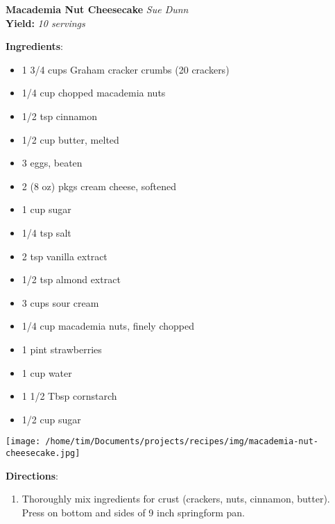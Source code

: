 \documentclass[11pt, twoside, openany]{book}
\begin{document}
\noindent\begin{minipage}[t]{\linewidth}%
{\Large\textbf{Macademia Nut Cheesecake}} \label{macademia-nut-cheesecake}\hfill\textit{Sue Dunn}\\
\textbf{Yield:} \textit{10 servings}\\
\noindent\begin{minipage}[t]{0.78\linewidth}%
\textbf{Ingredients}:\vspace{-3mm}
\begin{multicols}{2}
\begin{itemize}\setlength\itemsep{-1mm}
\item 1 3/4 cups Graham cracker crumbs (20 crackers)
\item 1/4 cup chopped macademia nuts
\item 1/2 tsp cinnamon
\item 1/2 cup butter, melted
\item 3 eggs, beaten
\item 2 (8 oz) pkgs cream cheese, softened
\item 1 cup sugar
\item 1/4 tsp salt
\item 2 tsp vanilla extract
\item 1/2 tsp almond extract
\item 3 cups sour cream
\item 1/4 cup macademia nuts, finely chopped
\item 1 pint strawberries
\item 1 cup water
\item 1 1/2 Tbsp cornstarch
\item 1/2 cup sugar
\end{itemize}
\end{multicols}
\end{minipage}
\noindent\begin{minipage}[t]{0.18\linewidth}
\centering \strut\vspace*{-\baselineskip}\newline
\texttt{[image: /home/tim/Documents/projects/recipes/img/macademia-nut-cheesecake.jpg]}\\
\end{minipage}\vspace{3mm}
\textbf{Directions}:
\vspace{-3mm}\begin{enumerate}\setlength\itemsep{-1mm}
\item Thoroughly mix ingredients for crust (crackers, nuts, cinnamon, butter). Press on bottom and sides of 9 inch springform pan.

\end{enumerate}
\end{minipage}
\end{document}

